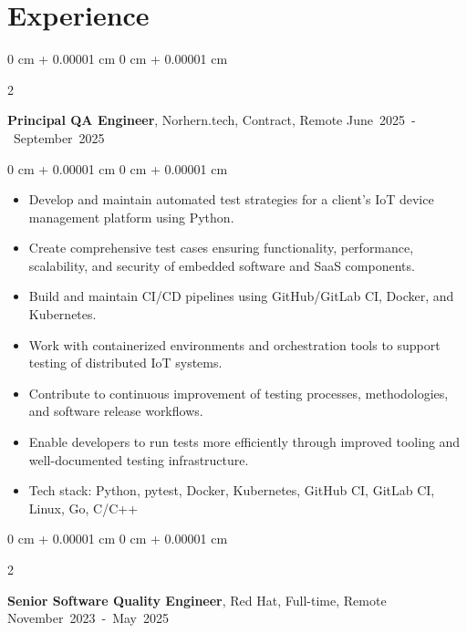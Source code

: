 \documentclass[10pt, a4paper]{article}
\newenvironment{highlights}{
    \begin{itemize}[
        topsep=0.05 cm,
        parsep=0.05 cm,
        partopsep=0pt,
        itemsep=0pt,
        leftmargin=0 cm + 10pt
    ]
}{
    \end{itemize}
} %
\newenvironment{onecolentry}{
    \begin{adjustwidth}{
        0 cm + 0.00001 cm
    }{
        0 cm + 0.00001 cm
    }
}{
    \end{adjustwidth}
} %
\newenvironment{twocolentry}[2][]{
    \onecolentry
    \def\secondColumn{#2}
    \setcolumnwidth{\fill, 4.5 cm}
    \begin{paracol}{2}
}{
    \switchcolumn \raggedleft \secondColumn
    \end{paracol}
    \endonecolentry
} %
\begin{document}
    \section{Experience}

        \begin{twocolentry}{
            \small\mbox{June 2025 - September 2025}
        }
            \textbf{Principal QA Engineer}, Norhern.tech, Contract, Remote\end{twocolentry}

        \vspace{0.10 cm}
        \begin{onecolentry}
            \begin{highlights}
                \item Develop and maintain automated test strategies for a client's IoT device management platform using Python.
                \item Create comprehensive test cases ensuring functionality, performance, scalability, and security of embedded software and SaaS components.
                \item Build and maintain CI/CD pipelines using GitHub/GitLab CI, Docker, and Kubernetes.
                \item Work with containerized environments and orchestration tools to support testing of distributed IoT systems.
                \item Contribute to continuous improvement of testing processes, methodologies, and software release workflows.
                \item Enable developers to run tests more efficiently through improved tooling and well-documented testing infrastructure.
                \item Tech stack: Python, pytest, Docker, Kubernetes, GitHub CI, GitLab CI, Linux, Go, C/C++
            \end{highlights}
        \end{onecolentry}

        \vspace{0.5 cm}

        \begin{twocolentry}{
            \small\mbox{November 2023 - May 2025}
        }
            \textbf{Senior Software Quality Engineer}, Red Hat, Full-time, Remote\end{twocolentry}

        \vspace{0.10 cm}
\end{document}
